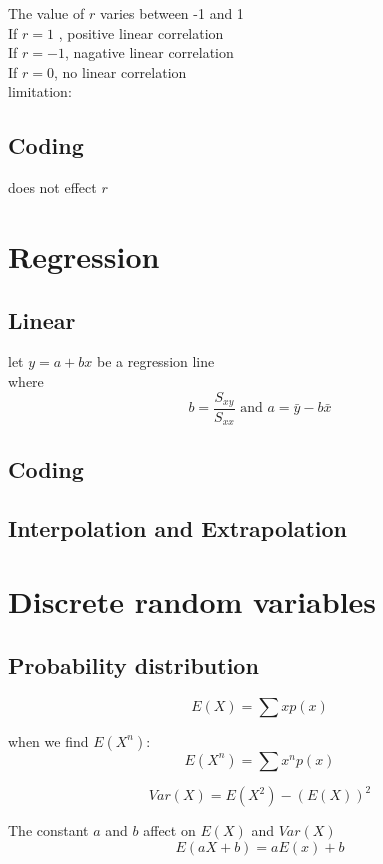 \documentclass[a4paper]{article}
\begin{document}
The value of $r$ varies between -1 and 1\\

If $r=1$ , positive linear correlation\\

If $r=-1$, nagative linear correlation\\

If $r=0$, no linear correlation\\

limitation:

\subsection{Coding}
does not effect $r$
\section{Regression}
\subsection{Linear}
let $y=a+bx$ be a regression line \\
where
\[
	b=\frac{S_{xy}}{S_{xx}} \mbox{~and~} a=\bar{y}-b\bar{x}
\]
\subsection{Coding}
\subsection{Interpolation and Extrapolation}

\section{Discrete random variables}
\subsection{Probability distribution}

\begin{defi}
	\[
		E(X)=\sum xp(x)
	\]
\end{defi}
when we find $E(X^n)$:
\[
	E(X^n)=\sum x^np(x)
\]
\begin{defi}[Variable]
	\[
		Var(X)=E(X^2)-(E(X))^2
	\]
\end{defi}

The constant $a$ and $b$ affect on $E(X)$ and $Var(X)$
\[
	E(aX+b)=aE(x)+b
\]
\end{document}
